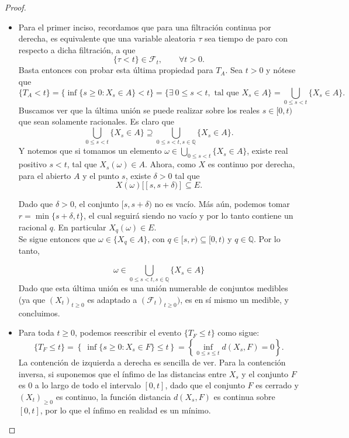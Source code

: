 \documentclass[letterpaper]{article}
\newcommand{\Q}{\mathbb{Q}}
\newcommand{\F}{\mathcal{F}}
\newcommand{\1}{\mathds{1}}
\theoremstyle{definition}
\theoremstyle{definition}
\theoremstyle{definition}
\theoremstyle{definition}
\theoremstyle{definition}
\begin{document}
\begin{proof} 
  \begin{itemize}
    \item Para el primer inciso, recordamos que para una filtración continua por derecha, es equivalente que una variable aleatoria $\tau$ sea tiempo de paro con respecto a dicha filtración, a que 
    \[
    \{\tau<t\}  \in \F_t, \qquad \forall t>0.
    \]
  Basta entonces con probar esta última propiedad para $T_A$. Sea $t>0$ y nótese que
  \[
  \{T_A<t\}=\{\inf\{s\geq0:X_s\in A\}<t\}=\{\exists \ 0\leq s<t,\text{ tal que } X_s\in A\}=\bigcup_{0\leq s<t}\{X_s\in A\}.
  \]
  Buscamos ver que la última unión se puede realizar sobre los reales $s\in [0,t)$ que sean solamente racionales. Es claro que 
  \[
    \bigcup_{0\leq s<t}\{X_s\in A\}\supseteq\bigcup_{0\leq s<t,s\in \Q}\{X_s\in A\}.  
  \]
  Y notemos que si tomamos un elemento $\omega \in \bigcup_{0\leq s<t}\{X_s\in A\}$, existe real positivo $s<t$, tal que $X_s(\omega)\in A$. Ahora, como $X$ es continuo por derecha, para el abierto $A$ y el punto $s$, existe $\delta>0$ tal que 
  \[
  X(\omega)[[s,s+\delta)]\subseteq E.    
  \] 

  Dado que $\delta>0$, el conjunto $[s,s+\delta)$ no es vacío. Más aún, podemos tomar $r=\min\{s+\delta,t\}$, el cual seguirá siendo no vacío y por lo tanto contiene
  un racional $q$. En particular $X_q(\omega)\in E$.\\ 
  
  Se sigue entonces que $\omega\in \{X_q\in A\}$, con $q\in [s,r)\subseteq[0,t)$ y $q\in \Q$. Por lo tanto, 

  \[
  \omega \in \bigcup_{0\leq s<t,s\in \Q}\{X_s\in A\}
  \]
  Dado que esta última unión es una unión numerable de conjuntos medibles (ya que $(X_t)_{t\geq0}$ es adaptado a $(\F_t)_{t\geq0})$, es en sí mismo un medible, y concluimos.
  \item Para toda $t\geq0$, podemos reescribir el evento $\{T_F\leq t\}$ como sigue:
  \[
  \{T_F\leq t\}=\left\{ \ \inf\{s\geq0 : X_s\in F\}\leq t\right\}=\left\{\inf_{0\leq s\leq t} d(X_s,F)=0\right\}.
  \]
  La contención de izquierda a derecha es sencilla de ver. Para la contención inversa, si suponemos que el ínfimo de las distancias entre $X_s$ y el conjunto $F$ es 0 a lo largo de todo el intervalo $[0,t]$, dado que el conjunto $F$ es cerrado y $(X_t)_{\geq0}$ es continuo, la función distancia $d(X_s,F)$ es continua sobre $[0,t]$, por lo que el ínfimo en realidad es un mínimo.\\


\end{itemize}
\end{proof}
\end{document}
